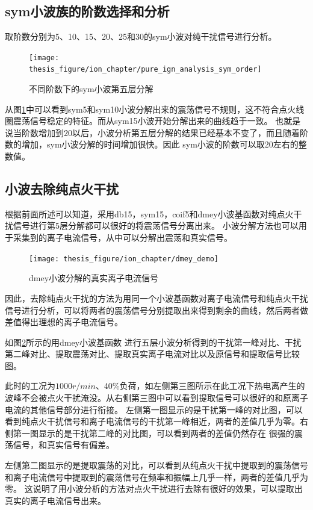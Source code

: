 \subsection{sym小波族的阶数选择和分析} 
取阶数分别为5、10、15、20、25和30的sym小波对纯干扰信号进行分析。
\begin{figure}[htb]
	\centering
	\texttt{[image: thesis\_figure/ion\_chapter/pure\_ign\_analysis\_sym\_order]}
	\caption{\label{fig:symvar}不同阶数下的sym小波第五层分解}
\end{figure}
从图\ref{fig:symvar}中可以看到sym5和sym10小波分解出来的震荡信号不规则，这不符合点火线圈震荡信号稳定的特征。而从sym15小波开始分解出来的曲线趋于一致。
也就是说当阶数增加到20以后，小波分析第五层分解的结果已经基本不变了，而且随着阶数的增加，sym小波分解的时间增加很快。因此
sym小波的阶数可以取20左右的整数值。\par
\subsection{小波去除纯点火干扰}
根据前面所述可以知道，采用db15，sym15，coif5和dmey小波基函数对纯点火干扰信号进行第5层分解都可以很好的将震荡信号分离出来。
小波分解方法也可以用于采集到的离子电流信号，从中可以分解出震荡和真实信号。
\begin{figure}[htb]
	\centering
	\texttt{[image: thesis\_figure/ion\_chapter/dmey\_demo]}
	\caption{\label{fig:dmey_realIon}dmey小波分解的真实离子电流信号}
\end{figure}
因此，去除纯点火干扰的方法为用同一个小波基函数对离子电流信号和纯点火干扰信号进行分析，可以将两者的震荡信号分别提取出来得到剩余的曲线，然后两者做差值得出理想的离子电流信号。\par
如图\ref{fig:dmey_realIon}所示的用dmey小波基函数
进行五层小波分析得到的干扰第一峰对比、干扰第二峰对比、提取震荡对比、提取真实离子电流对比以及原信号和提取信号比较图。\par
此时的工况为$1000r/min$、40\%负荷，如左侧第三图所示在此工况下热电离产生的波峰不会被点火干扰淹没。从右侧第三图中可以看到提取信号可以很好的和原离子电流的其他信号部分进行衔接。
左侧第一图显示的是干扰第一峰的对比图，可以看到纯点火干扰信号和离子电流信号的干扰第一峰相近，两者的差值几乎为零。右侧第一图显示的是干扰第二峰的对比图，可以看到两者的差值仍然存在
很强的震荡信号，和真实信号有偏差。\par
左侧第二图显示的是提取震荡的对比，可以看到从纯点火干扰中提取到的震荡信号和离子电流信号中提取到的震荡信号在频率和振幅上几乎一样，两者的差值几乎为零。
这说明了用小波分析的方法对点火干扰进行去除有很好的效果，可以提取出真实的离子电流信号出来。
